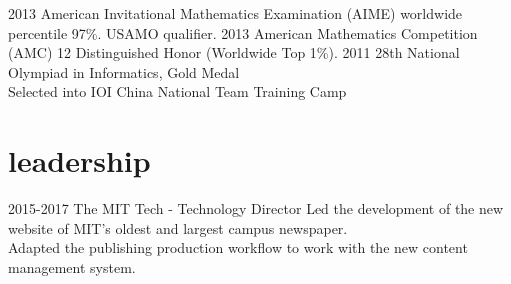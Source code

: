 \documentclass[]{friggeri-cv} %
\begin{document}
\begin{entrylist}
  \centry
  {2013}
  {American Invitational Mathematics Examination (AIME) worldwide percentile 97\%. USAMO qualifier. }
  \centry
  {2013}
  {American Mathematics Competition (AMC) 12 Distinguished Honor (Worldwide Top 1\%). }
  \centry
  {2011}
  {28th National Olympiad in Informatics, Gold Medal \\
  Selected into IOI China National Team Training Camp}
\end{entrylist}



\section{leadership}

\begin{entrylist}
  \entry
  {2015-2017}
  {The MIT Tech - Technology Director}
  {}
  {Led the development of the new website of MIT's oldest and largest campus newspaper. \\
  Adapted the publishing production workflow to work with the new content management system. }
\end{entrylist}
\end{document}
